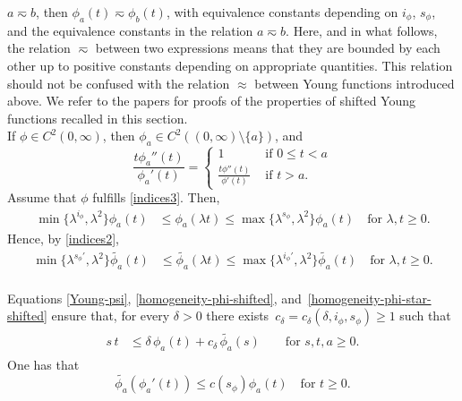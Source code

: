 \documentclass[leqno,11pt]{amsart}%
\numberwithin{equation}{section}
\theoremstyle{definition}
\numberwithin{equation}{section}
\begin{document}
$a \eqsim b$, then $\phi_a(t) \eqsim \phi_b(t)$, with equivalence constants depending on  $i_\phi$, $s_\phi$, and the equivalence constants in the relation $a \eqsim b$.
 Here, and in what follows, the relation $\eqsim$ between two expressions means that they are bounded by each other up to positive constants depending on appropriate quantities. This relation should not be confused with the relation $\approx$
between Young functions introduced above.
We refer to the papers \cites{DieEtt08, DieForTomWan19} for proofs of the properties of shifted Young functions recalled in this section.
\\ If $\phi \in C^2(0, \infty)$, then   $\phi_a\in C^2((0, \infty) \setminus \{a\})$, and 
\begin{equation*}
  \frac{t\phi_a''(t)}{\phi_a'(t)}
  =
  \left\{
  \begin{array}{cl}
    1&\mbox{ if $0\le t<a$}\\[0.8ex]
    \displaystyle \frac{t\phi''(t)}{\phi'(t)}&\mbox{ if $t>a$.}
  \end{array}
  \right.
\end{equation*}
Assume that $\phi$ fulfills \eqref{indices3}. Then,
\begin{align}
    \min\{\lambda^{i_\phi},\lambda^2\} \phi_a(t)
    &\le \phi_a(\lambda t)
      \le \max\{\lambda^{s_\phi},\lambda^2\}\phi_a(t) \quad \text{for $\lambda, t \geq 0$.}
      \label{homogeneity-phi-shifted}
      \end{align}
      Hence, by \eqref{indices2},
      \begin{align} 
   \min\{\lambda^{s_\phi'},\lambda^2\} \widetilde{\phi_a}(t)
    &\le \widetilde{\phi_a}(\lambda t)
      \le\max\{\lambda^{i_\phi'},\lambda^2\}\widetilde{\phi_a}(t) \quad \text{for $\lambda, t \geq 0$.}
      \label{homogeneity-phi-star-shifted}
  \end{align}
\\ Equations \eqref{Young-psi},
   \eqref{homogeneity-phi-shifted},
and~\eqref{homogeneity-phi-star-shifted} ensure  that, for
every $\delta>0$ there exists~$c_\delta=c_\delta(\delta,i_\phi,s_\phi)\geq 1$ such
that 
\begin{align}
  \label{eq:young}
  \begin{aligned}
    s\,t &\leq \delta\,\phi_{a}(t) + c_\delta\, \widetilde{\phi_a}(s) \qquad \text{for $s,t,a\geq 0$.}
  \end{aligned}
\end{align}
One has that
\begin{equation}\label{bound-phi-star}
    \widetilde {\phi_a}(\phi_a'(t))
    \le
    c(s_\phi)\phi_a(t) \quad \text{for $t \geq 0$.}
\end{equation}
\end{document}
